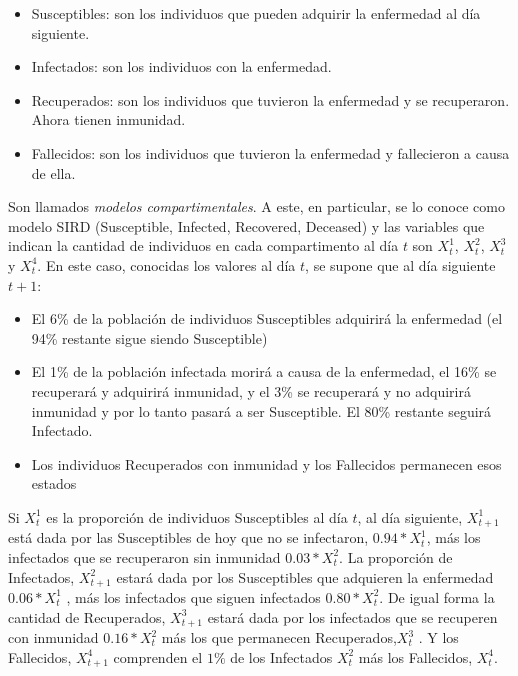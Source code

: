 \begin{itemize}
\item

Susceptibles: son los individuos que pueden adquirir la enfermedad al día siguiente.
\item
Infectados: son los individuos con la enfermedad.

\item
Recuperados: son los individuos que tuvieron la enfermedad y se recuperaron. Ahora tienen inmunidad.

\item
Fallecidos: son los individuos que tuvieron la enfermedad y fallecieron a causa de ella.

\end{itemize}


\bigskip


Son llamados \textit{modelos compartimentales}. A este, en particular, se lo conoce como modelo SIRD (Susceptible, Infected, Recovered, Deceased) y las variables que indican  la cantidad de individuos en cada compartimento al día $t$ son $X_t^1$, $X_t^2$, $X_t^3$  y $X_t^4$. En este caso, conocidas los valores al día $t$, se supone que al día siguiente $t+1$:

\begin{itemize}
\item

El 6\% de la población de individuos Susceptibles adquirirá la enfermedad (el 94\% restante sigue siendo Susceptible)
\item

El 1\% de la población infectada morirá a causa de la enfermedad, el 16\% se recuperará y adquirirá inmunidad, y el 3\% se recuperará y no adquirirá inmunidad y por lo tanto pasará a ser Susceptible. El 80\% restante seguirá Infectado.
\item

Los individuos  Recuperados con inmunidad  y los Fallecidos permanecen esos estados



\end{itemize}


\bigskip


Si $X_t^1$ es  la proporción de individuos Susceptibles al día $t$,  al día siguiente, $X_{t+1}^1$  está dada por las Susceptibles de hoy que no se infectaron, $0.94*X_t^1$, más los infectados que se recuperaron sin inmunidad $0.03 *X_t^2   $.
La proporción de Infectados, $X_{t+1}^2$ estará dada por los Susceptibles que adquieren la enfermedad  $0.06 *X_t^1   $ , más los infectados que siguen infectados $0.80 *X_t^2$. De igual forma la cantidad de Recuperados, $ X_{t+1}^3$  estará dada por los infectados que se recuperen con inmunidad  $0.16 *X_t^2$    más los que permanecen Recuperados,$ X_{t}^3$ . Y los Fallecidos, $X_{t+1}^4$ comprenden el $1\%$ de los Infectados $X_{t}^2$  más los Fallecidos, $X_{t}^4$.


